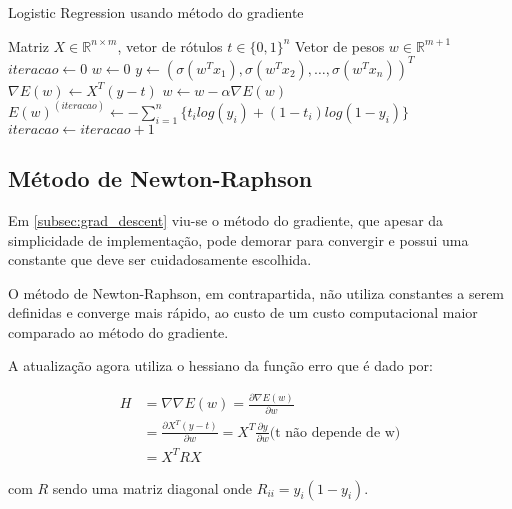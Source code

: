 \begin{algorithm}[H]
	\caption{Logistic Regression usando método do gradiente}
	\begin{algorithmic}[1]
		\REQUIRE Matriz $ X \in \mathbb{R}^{n \times m} $, 
		vetor de rótulos $t \in \{0, 1\}^n$
		\ENSURE Vetor de pesos $w \in \mathbb{R}^{m + 1}$
		\STATE $iteracao \leftarrow 0$
		\STATE $w \leftarrow 0$
			\STATE $y \leftarrow (\sigma(w^Tx_1), \sigma(w^Tx_2), \ldots, \sigma(w^Tx_n))^T$ 
			\STATE $\nabla E(w) \leftarrow X^T(y - t)$ 
			\STATE $w \leftarrow w - \alpha \nabla E(w)$ 
			\STATE $E(w)^{ (iteracao) } \leftarrow 
			- \sum_{i = 1}^{n} \{ t_ilog(y_i) + (1 - t_i) log(1 - y_i) \}$ 
			\STATE $iteracao \leftarrow iteracao + 1$
		\ENDWHILE
	\end{algorithmic}
\end{algorithm}

\subsection{Método de Newton-Raphson}
\label{subsec:newton-raphson}

Em \ref{subsec:grad_descent} viu-se o método do gradiente, que apesar da simplicidade de implementação,
pode demorar para convergir e possui uma constante que deve ser cuidadosamente escolhida.

O método de Newton-Raphson, em contrapartida, não utiliza constantes a serem definidas e
converge mais rápido, ao custo de um custo computacional maior comparado ao método do gradiente.

A atualização agora utiliza o hessiano da função erro que é dado por:

\begin{center}
	\begin{equation}
		\begin{split}
			\label{eq:hessian_error}
			H &= \nabla \nabla E(w) = \frac{\partial \nabla E(w)}{\partial w} \\
			& = \frac{\partial X^T(y - t)}{\partial w} =  X^T \frac{\partial y}{\partial w} \text{(t não depende de w)} \\
			& = X^TRX
		\end{split}
	\end{equation}
\end{center}
com $R$ sendo uma matriz diagonal onde $R_{ii} = y_i(1 - y_i)$.

